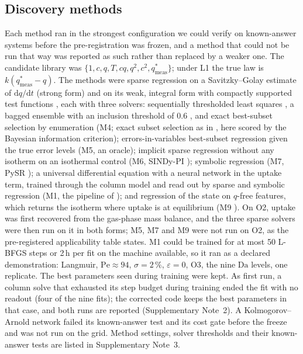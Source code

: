 \documentclass[11pt]{article}
\newcommand{\Da}{\mathrm{Da}}
\newcommand{\Pe}{\mathrm{Pe}}
\newcommand{\qsm}{q^{*}_{\mathrm{meas}}}
\begin{document}
\subsection*{Discovery methods}
Each method ran in the strongest configuration we could verify on known-answer systems
before the pre-registration was frozen, and a method that could not be run that way was
reported as such rather than replaced by a weaker one. The candidate library was
$\{1, c, q, T, cq, q^2, c^2, \qsm\}$; under L1 the true law is $k(\qsm - q)$. The methods
were sparse regression on a Savitzky--Golay estimate of $\mathrm{d}q/\mathrm{d}t$ (strong
form) and on its weak, integral form with compactly supported test functions
\citep{messenger2021ode,messenger2021pde}, each with three solvers: sequentially thresholded
least squares \citep{brunton2016}, a bagged ensemble with an inclusion threshold of 0.6
\citep{fasel2022}, and exact best-subset selection by enumeration (M4; exact subset selection
as in \citep{bertsimas2022}, here scored by the Bayesian information criterion); errors-in-variables
best-subset regression given the true error levels (M5, an oracle); implicit sparse
regression without any isotherm on an isothermal control (M6, SINDy-PI \citep{kaheman2020});
symbolic regression (M7, PySR \citep{cranmer2023}); a universal differential equation with a
neural network in the uptake term, trained through the column model and read out by sparse
and symbolic regression (M1, the pipeline of \citep{santana2023}); and regression of the state
on $q$-free features, which returns the isotherm where uptake is at equilibrium (M9
\citep{delgado2025}). On O2, uptake was first recovered from the gas-phase mass balance,
and the three sparse solvers were then run on it in both forms; M5, M7 and M9 were not run on
O2, as the pre-registered applicability table states.
M1 could be trained for at most 50 L-BFGS steps or 2\,h per fit on the machine available, so it ran as a declared demonstration: Langmuir,
$\Pe \approx 94$, $\sigma = 2\,\%$, $\varepsilon = 0$, O3, the nine $\Da$ levels, one
replicate. The best parameters seen during training were kept. As first run, a column solve
that exhausted its step budget during training ended the fit with no readout (four of the
nine fits); the corrected code keeps the best parameters in that case, and both runs are
reported (Supplementary Note~2). A Kolmogorov--Arnold network \citep{liu2024} failed its known-answer test and its
cost gate before the freeze and was not run on the grid. Method settings, solver thresholds
and their known-answer tests are listed in Supplementary Note~3.
\end{document}
